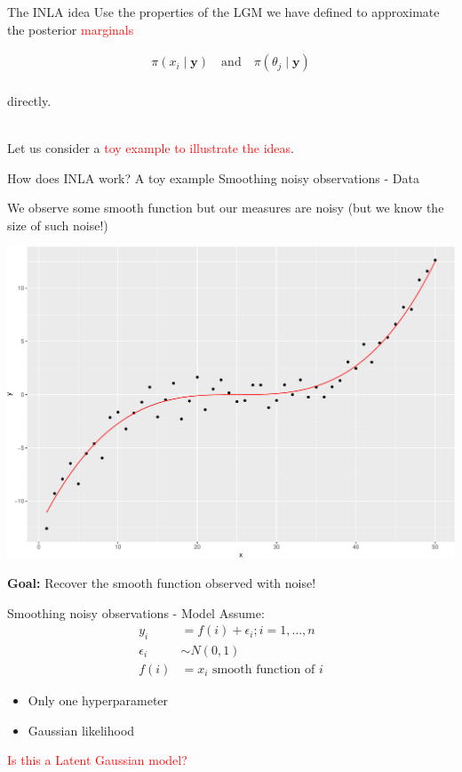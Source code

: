 \documentclass[
  ignorenonframetext,
]{beamer}
\begin{document}
\begin{frame}{The INLA idea}
\protect\hypertarget{the-inla-idea}{}
Use the properties of the LGM we have defined to approximate the
posterior \textcolor{red}{marginals}

\[
\begin{aligned}
        \pi(x_i \mid \boldsymbol{y})\quad \text{and} \quad \pi(\theta_j \mid \boldsymbol{y})
    \end{aligned}
\]\\
directly.\\
\strut \\
Let us consider a \textcolor{red}{toy example to illustrate the ideas}.
\end{frame}

\begin{frame}{How does INLA work? A toy example}
\protect\hypertarget{how-does-inla-work-a-toy-example}{}
Smoothing noisy observations - Data

We observe some smooth function but our measures are noisy (but we know
the size of such noise!)

\begin{center}\includegraphics[width=0.6\linewidth]{Part1_intro_files/figure-beamer/unnamed-chunk-13-1} \end{center}

\textbf{Goal:} Recover the smooth function observed with noise!
\end{frame}

\begin{frame}{Smoothing noisy observations - Model}
\protect\hypertarget{smoothing-noisy-observations---model}{}
Assume: \begin{align*}
y_i &= f(i) + \epsilon_i; i = 1,\dots,n \\\nonumber
\epsilon_i&\sim N(0,1) \\\nonumber
f(i) &= x_i\text{ smooth function of } i\nonumber
\end{align*}

\begin{itemize}
\item
  Only one hyperparameter
\item
  Gaussian likelihood
\end{itemize}

\textcolor{red}{Is this a Latent Gaussian model?}
\end{frame}
\end{document}
